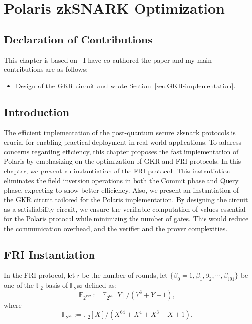 \chapter{Polaris zkSNARK Optimization}\label{ch:polaris}

\section*{Declaration of Contributions}
This chapter is based on~\cite{Badakhshan2025Ursa} I have co-authored the paper and my main contributions are as follows:
\begin{itemize}
	\item Design of the GKR circuit and wrote Section~\ref{sec:GKR-implementation}.
\end{itemize}

\section{Introduction}
The efficient implementation of the  post-quantum secure \gls{zksnark} protocols is crucial for enabling practical deployment in real-world applications. To address concerns regarding efficiency, this chapter proposes the fast implementation of Polaris by emphasizing on the optimization of GKR and FRI protocols.  In this chapter, we present an instantiation of the FRI protocol. This instantiation eliminates the field inversion operations in both the Commit phase and Query phase, expecting to show  better efficiency. Also, we present an instantiation of the GKR circuit tailored for the Polaris implementation. By designing the circuit as a  satisfiability circuit, we ensure the verifiable computation of values essential for the Polaris protocol while minimizing the number of gates. This would reduce the communication overhead, and the verifier and the prover complexities.

\section{FRI Instantiation}
\label{sec:FRI_instantiation}

In the FRI protocol, let $\mathsf{r}$ be the number of rounds, let $\{\beta_0 = 1, \beta_1, \beta_2,\cdots, \beta_{191}\}$ be one of the $\mathbb{F}_2$-basis of $\mathbb{F}_{2^{192}}$ defined as:
\begin{equation}\label{eq_F_2_192}
	\mathbb{F}_{2^{192}} := \mathbb{F}_{2^{64}}[Y]/(Y^3 + Y + 1),
\end{equation}
where
\begin{equation}\label{eq_F_2_64}
	\mathbb{F}_{2^{64}} := \mathbb{F}_{2}[X]/(X^{64} + X^4 + X^3 + X + 1).
\end{equation}
\newline

